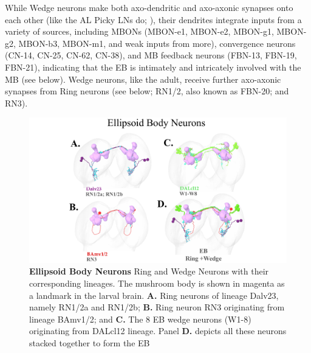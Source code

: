     While Wedge neurons make both axo-dendritic and axo-axonic synapses onto each other (like the AL Picky LNs do; \citep{berck2016wiring}), their dendrites integrate inputs from a variety of sources, including MBONs (MBON-e1, MBON-e2, MBON-g1, MBON-g2, MBON-b3, MBON-m1, and weak inputs from more), convergence neurons (CN-14, CN-25, CN-62, CN-38), and MB feedback neurons (FBN-13, FBN-19, FBN-21), indicating that the EB is intimately and intricately involved with the MB (see below).
    Wedge neurons, like the adult, receive further axo-axonic synapses from Ring neurons (see below; RN1/2, also known as FBN-20; and RN3).
      

        \begin{figure}
            \centering
            \includegraphics[width=12cm]{Figs/CX/EBneurons.pdf}
            \caption{\textbf{Ellipsoid Body Neurons} Ring and Wedge Neurons with their corresponding lineages. The mushroom body is shown in magenta as a landmark in the larval brain. \textbf{A.} Ring neurons of lineage Dalv23, namely RN1/2a and RN1/2b; \textbf{B.} Ring neuron RN3 originating from lineage BAmv1/2; and \textbf{C.} The 8 EB wedge neurons (W1-8) originating from DALcl12 lineage. Panel \textbf{D.} depicts all these neurons stacked together to form the EB}
            \label{EBneurons}
        \end{figure}


